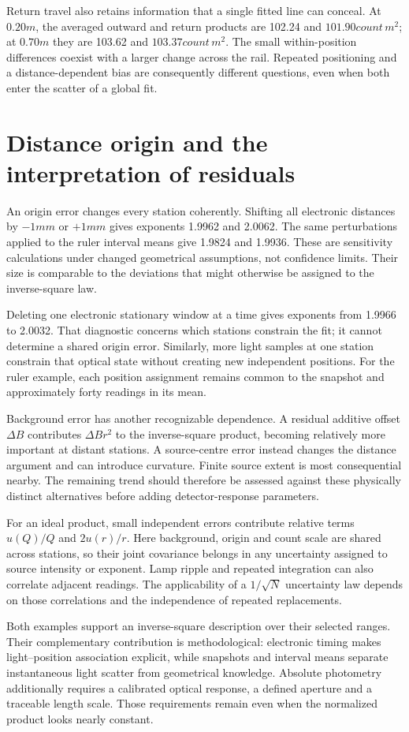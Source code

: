 Return travel also retains information that a single fitted line can conceal. At $0.20\unit{m}$, the averaged outward and return products are 102.24 and $101.90\unit{count\,m^2}$; at $0.70\unit{m}$ they are 103.62 and $103.37\unit{count\,m^2}$. The small within-position differences coexist with a larger change across the rail. Repeated positioning and a distance-dependent bias are consequently different questions, even when both enter the scatter of a global fit.

\section{Distance origin and the interpretation of residuals}
An origin error changes every station coherently. Shifting all electronic distances by $-1\unit{mm}$ or $+1\unit{mm}$ gives exponents 1.9962 and 2.0062. The same perturbations applied to the ruler interval means give 1.9824 and 1.9936. These are sensitivity calculations under changed geometrical assumptions, not confidence limits. Their size is comparable to the deviations that might otherwise be assigned to the inverse-square law.

Deleting one electronic stationary window at a time gives exponents from 1.9966 to 2.0032. That diagnostic concerns which stations constrain the fit; it cannot determine a shared origin error. Similarly, more light samples at one station constrain that optical state without creating new independent positions. For the ruler example, each position assignment remains common to the snapshot and approximately forty readings in its mean.

Background error has another recognizable dependence. A residual additive offset $\Delta B$ contributes $\Delta B r^2$ to the inverse-square product, becoming relatively more important at distant stations. A source-centre error instead changes the distance argument and can introduce curvature. Finite source extent is most consequential nearby. The remaining trend should therefore be assessed against these physically distinct alternatives before adding detector-response parameters.

For an ideal product, small independent errors contribute relative terms $u(Q)/Q$ and $2u(r)/r$. Here background, origin and count scale are shared across stations, so their joint covariance belongs in any uncertainty assigned to source intensity or exponent. Lamp ripple and repeated integration can also correlate adjacent readings. The applicability of a $1/\sqrt N$ uncertainty law depends on those correlations and the independence of repeated replacements.

Both examples support an inverse-square description over their selected ranges. Their complementary contribution is methodological: electronic timing makes light--position association explicit, while snapshots and interval means separate instantaneous light scatter from geometrical knowledge. Absolute photometry additionally requires a calibrated optical response, a defined aperture and a traceable length scale. Those requirements remain even when the normalized product looks nearly constant.
